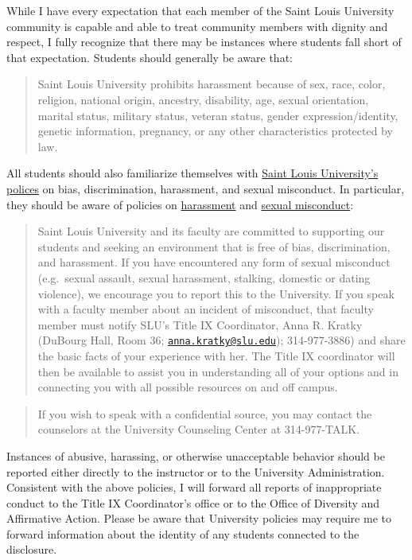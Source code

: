 \documentclass[]{book}
\begin{document}
While I have every expectation that each member of the Saint Louis University community is capable and able to treat community members with dignity and respect, I fully recognize that there may be instances where students fall short of that expectation. Students should generally be aware that:

\begin{quote}
Saint Louis University prohibits harassment because of sex, race, color, religion, national origin, ancestry, disability, age, sexual orientation, marital status, military status, veteran status, gender expression/identity, genetic information, pregnancy, or any other characteristics protected by law.
\end{quote}

All students should also familiarize themselves with \href{http://www.slu.edu/general-counsel-home/office-of-institutional-equity-and-diversity}{Saint Louis University's polices} on bias, discrimination, harassment, and sexual misconduct. In particular, they should be aware of policies on \href{https://www.slu.edu/general-counsel/institutional-equity-diversity/pdfs/harassment-policy.pdf}{harassment} and \href{https://www.slu.edu/about/safety/sexual-assault-resources.php}{sexual misconduct}:

\begin{quote}
Saint Louis University and its faculty are committed to supporting our students and seeking an environment that is free of bias, discrimination, and harassment. If you have encountered any form of sexual misconduct (e.g.~sexual assault, sexual harassment, stalking, domestic or dating violence), we encourage you to report this to the University. If you speak with a faculty member about an incident of misconduct, that faculty member must notify SLU's Title IX Coordinator, Anna R. Kratky (DuBourg Hall, Room 36; \href{mailto:anna.kratky@slu.edu}{\nolinkurl{anna.kratky@slu.edu}}); 314-977-3886) and share the basic facts of your experience with her. The Title IX coordinator will then be available to assist you in understanding all of your options and in connecting you with all possible resources on and off campus.
\end{quote}

\begin{quote}
If you wish to speak with a confidential source, you may contact the counselors at the University Counseling Center at 314-977-TALK.
\end{quote}

Instances of abusive, harassing, or otherwise unacceptable behavior should be reported either directly to the instructor or to the University Administration. Consistent with the above policies, I will forward all reports of inappropriate conduct to the Title IX Coordinator's office or to the Office of Diversity and Affirmative Action. Please be aware that University policies may require me to forward information about the identity of any students connected to the disclosure.
\end{document}

